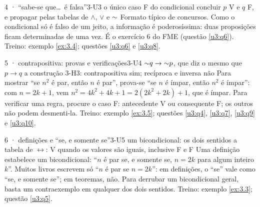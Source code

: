 \begin{caso}{4 · \enquote{sabe-se que\ldots\ é falsa}}{3-U3}
{o único caso F do condicional}
{concluir $p$ V e $q$ F, e propagar pelas tabelas de $\wedge$, $\vee$ e ${{\sim}}$}
\reconhecer Formato típico de concursos. Como o condicional só é falso de um jeito, a informação é poderosíssima: duas proposições ficam determinadas de uma vez. É o exercício 6 do FME (questão \ref{u3:q6}). Treino: exemplo \ref{ex:3.4}; questões \ref{u3:q6} e \ref{u3:q8}.
\end{caso}

\begin{caso}{5 · contrapositiva: provas e verificações}{3-U4}
{${{\sim}}q\rightarrow{{\sim}}p$, que diz o mesmo que $p\rightarrow q$}
{a construção 3-H3: contrapositiva sim; recíproca e inversa não}
\reconhecer Para mostrar \enquote{se $n^2$ é par, então $n$ é par}, prova-se \enquote{se $n$ é ímpar, então $n^2$ é ímpar}: com $n=2k+1$, vem $n^2=4k^2+4k+1=2(2k^2+2k)+1$, que é ímpar. Para verificar uma regra, procure o caso F: antecedente V ou consequente F; os outros não podem desmenti-la. Treino: exemplo \ref{ex:3.5}; questões \ref{u3:q4}, \ref{u3:q7}, \ref{u3:q9} e \ref{u3:q10}.
\end{caso}

\begin{caso}{6 · definições e \enquote{se, e somente se}}{3-U5}
{um bicondicional: os dois sentidos}
{a tabela de $\leftrightarrow$: V quando os valores são iguais, inclusive F e F}
\reconhecer Uma definição estabelece um bicondicional: \enquote{$n$ é par se, e somente se, $n=2k$ para algum inteiro $k$}. Muitos livros escrevem só \enquote{$n$ é par se $n=2k$}: em definições, o \enquote{se} vale como \enquote{se, e somente se}; em teoremas, não. Para derrubar um bicondicional geral, basta um contraexemplo em qualquer dos dois sentidos. Treino: exemplo \ref{ex:3.3}; questão \ref{u3:q5}.
\end{caso}

